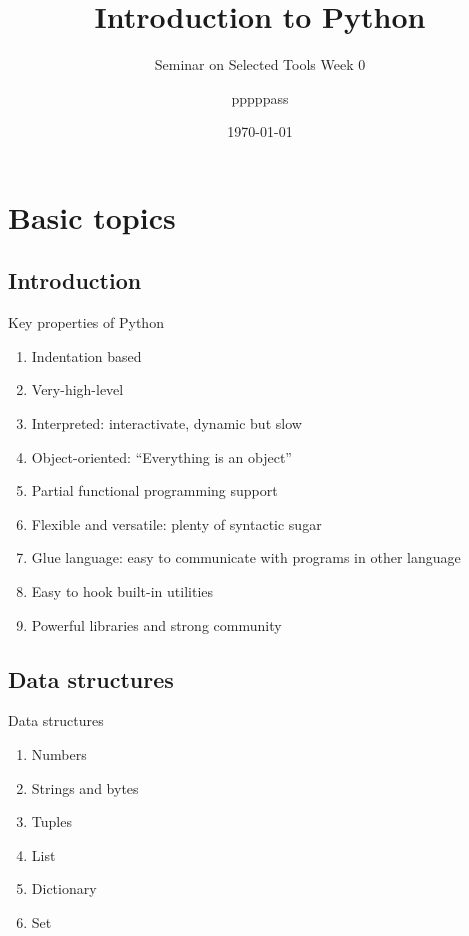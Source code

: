\documentclass[english, nochinese]{pkuslide}
\title{Introduction to Python}
\subtitle{Seminar on Selected Tools Week 0}
\author{pppppass}
\date{\today}
\begin{document}
\begin{frame}
\titlepage
\end{frame}

\begin{frame}
\tableofcontents[subsectionstyle=show]
\end{frame}

\section{Basic topics}

\begin{frame}
\sectionpage
\end{frame}

\subsection{Introduction}

\begin{frame}{Key properties of Python}
\begin{enumerate}
\item Indentation based
\item Very-high-level
\item Interpreted: interactivate, dynamic but slow
\item Object-oriented: ``Everything is an object''
\item Partial functional programming support
\item Flexible and versatile: plenty of syntactic sugar
\item Glue language: easy to communicate with programs in other language
\item Easy to hook built-in utilities
\item Powerful libraries and strong community
\end{enumerate}
\end{frame}

\subsection{Data structures}

\begin{frame}{Data structures}
\begin{enumerate}
\item Numbers
\item Strings and bytes
\item Tuples
\item List
\item Dictionary
\item Set
\end{enumerate}
\end{frame}
\end{document}
